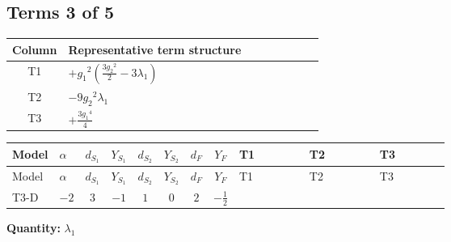 \documentclass[8pt]{article}
\begin{document}
\begin{landscape}
\subsection*{Terms 3 of 5}
\begin{center}
\begin{tabular}{@{}c >{\raggedright\arraybackslash}p{0.82\linewidth}@{}}
\toprule
Column & Representative term structure \\
\midrule
T1 & \(\displaystyle +{g_1}^2 \left(\frac{3 {g_2}^2}{2}-3 {\lambda_1}\right)\) \\
\midrule
T2 & \(\displaystyle -9 {g_2}^2 {\lambda_1}\) \\
\midrule
T3 & \(\displaystyle +\frac{3 {g_1}^4}{4}\) \\
\midrule
\bottomrule
\end{tabular}
\end{center}
\smallskip
\tiny
\begin{longtable}{@{}llcccccc >{\raggedright\arraybackslash}p{0.21\linewidth} >{\raggedright\arraybackslash}p{0.21\linewidth} >{\raggedright\arraybackslash}p{0.21\linewidth}@{}}
\toprule
Model & $\alpha$ & $d_{S_1}$ & $Y_{S_1}$ & $d_{S_2}$ & $Y_{S_2}$ & $d_F$ & $Y_F$ & T1 & T2 & T3 \\
\midrule
\endfirsthead
\toprule
Model & $\alpha$ & $d_{S_1}$ & $Y_{S_1}$ & $d_{S_2}$ & $Y_{S_2}$ & $d_F$ & $Y_F$ & T1 & T2 & T3 \\
\midrule
\endhead
T3-D & $-2$ & $3$ & $-1$ & $1$ & $0$ & $2$ & $-\frac{1}{2}$ & \scriptsize\adjustbox{max width=\linewidth}{$\begin{gathered} +{g_1}^2 \left(\frac{3 {g_2}^2}{2}-3 {\lambda_1}\right)\end{gathered}$} & \scriptsize\adjustbox{max width=\linewidth}{$\begin{gathered} -9 {g_2}^2 {\lambda_1}\end{gathered}$} & \scriptsize\adjustbox{max width=\linewidth}{$\begin{gathered} +\frac{3 {g_1}^4}{4}\end{gathered}$} \\
\midrule
\bottomrule
\end{longtable}
\clearpage
\noindent\textbf{Quantity: }$\lambda_1$\par\smallskip

\end{landscape}
\end{document}
